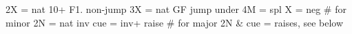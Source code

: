2X = nat 10+ F1. non-jump 3X = nat GF
jump under 4M = spl
X = neg
# for minor
2N = nat inv 
cue = inv+ raise
# for major
2N & cue = raises, see below
